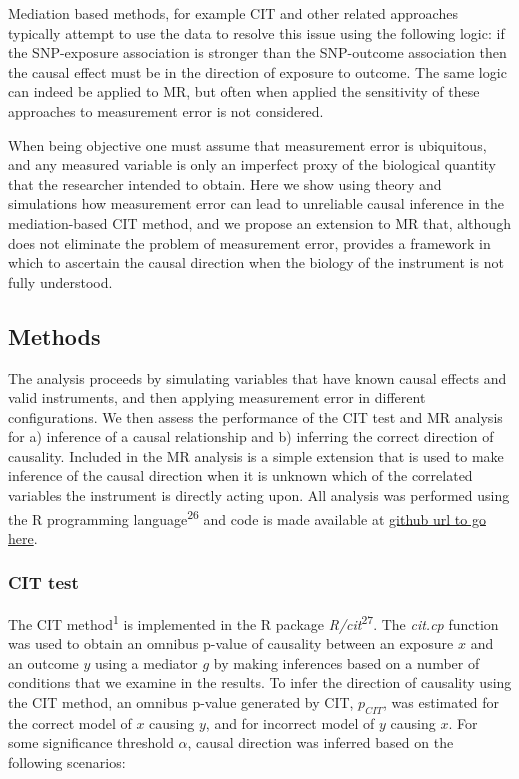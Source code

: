 \documentclass[]{article}
\begin{document}
Mediation based methods, for example CIT and other related approaches
typically attempt to use the data to resolve this issue using the
following logic: if the SNP-exposure association is stronger than the
SNP-outcome association then the causal effect must be in the direction
of exposure to outcome. The same logic can indeed be applied to MR, but
often when applied the sensitivity of these approaches to measurement
error is not considered.

When being objective one must assume that measurement error is
ubiquitous, and any measured variable is only an imperfect proxy of the
biological quantity that the researcher intended to obtain. Here we show
using theory and simulations how measurement error can lead to
unreliable causal inference in the mediation-based CIT method, and we
propose an extension to MR that, although does not eliminate the problem
of measurement error, provides a framework in which to ascertain the
causal direction when the biology of the instrument is not fully
understood.

\subsection{Methods}\label{methods}

The analysis proceeds by simulating variables that have known causal
effects and valid instruments, and then applying measurement error in
different configurations. We then assess the performance of the CIT test
and MR analysis for a) inference of a causal relationship and b)
inferring the correct direction of causality. Included in the MR
analysis is a simple extension that is used to make inference of the
causal direction when it is unknown which of the correlated variables
the instrument is directly acting upon. All analysis was performed using
the R programming language\textsuperscript{26} and code is made
available at \href{}{github url to go here}.

\subsubsection{CIT test}\label{cit-test}

The CIT method\textsuperscript{1} is implemented in the R package
\emph{R/cit}\textsuperscript{27}. The \emph{cit.cp} function was used to
obtain an omnibus p-value of causality between an exposure \(x\) and an
outcome \(y\) using a mediator \(g\) by making inferences based on a
number of conditions that we examine in the results. To infer the
direction of causality using the CIT method, an omnibus p-value
generated by CIT, \(p_{CIT}\), was estimated for the correct model of
\(x\) causing \(y\), and for incorrect model of \(y\) causing \(x\). For
some significance threshold \(\alpha\), causal direction was inferred
based on the following scenarios:
\end{document}
